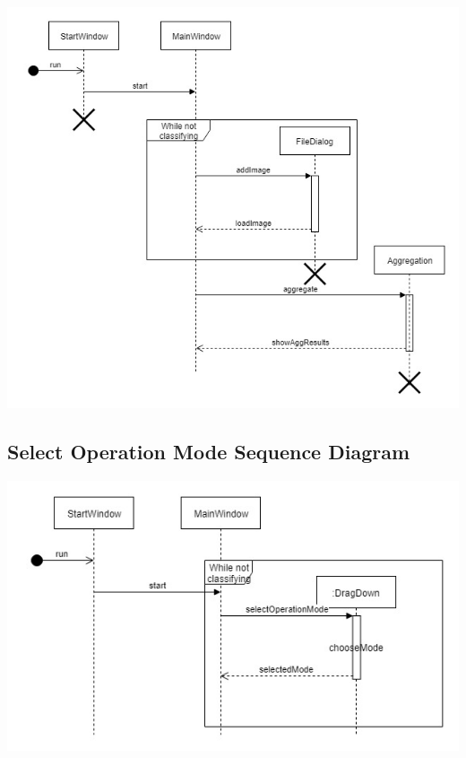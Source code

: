 \documentclass[parskip=full]{scrartcl}
\begin{document}
\begin{itemize}
\begin{center}
\includegraphics[width=1.0\textwidth]{Aggregate.jpg}
\end{center}

\pagebreak

\subsection {Select Operation Mode Sequence Diagram}

\begin{center}
\includegraphics[width=1.0\textwidth]{SelectOperationModeSequenceDiag.jpg}
\end{center}

\pagebreak


\end{itemize}
\end{document}
